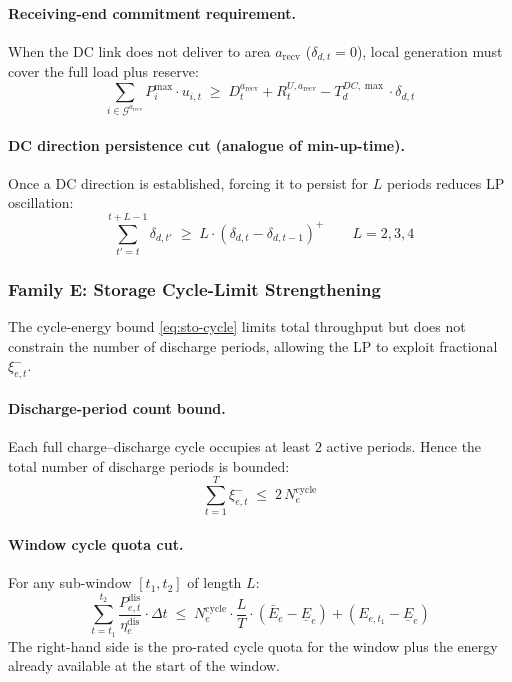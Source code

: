 \paragraph{Receiving-end commitment requirement.}
When the DC link does not deliver to area $a_{\mathrm{recv}}$
($\delta_{d,t} = 0$), local generation must cover the full load plus reserve:
\begin{equation}\label{eq:cut-D-recv}
  \boxed{
    \sum_{i \in \mathcal{G}^{a_{\mathrm{recv}}}} P^{\max}_i \cdot u_{i,t}
    \;\geq\;
    D^{a_{\mathrm{recv}}}_t + R^{U,a_{\mathrm{recv}}}_t
    - T^{DC,\max}_d \cdot \delta_{d,t}
  }
\end{equation}

\paragraph{DC direction persistence cut (analogue of min-up-time).}
Once a DC direction is established, forcing it to persist for $L$ periods
reduces LP oscillation:
\begin{equation}\label{eq:cut-D-persist}
  \sum_{t'=t}^{t+L-1} \delta_{d,t'} \;\geq\; L \cdot (\delta_{d,t} - \delta_{d,t-1})^+
  \qquad L = 2, 3, 4
\end{equation}

\subsubsection{Family E: Storage Cycle-Limit Strengthening}
\label{sec:cut-E}

The cycle-energy bound \eqref{eq:sto-cycle} limits total throughput but
does not constrain the number of discharge periods, allowing the LP to
exploit fractional $\xi^-_{e,t}$.

\paragraph{Discharge-period count bound.}
Each full charge--discharge cycle occupies at least $2$ active periods.
Hence the total number of discharge periods is bounded:
\begin{equation}\label{eq:cut-E-count}
  \boxed{
    \sum_{t=1}^{T} \xi^-_{e,t} \;\leq\; 2\,N^{\mathrm{cycle}}_e
  }
\end{equation}

\paragraph{Window cycle quota cut.}
For any sub-window $[t_1, t_2]$ of length $L$:
\begin{equation}\label{eq:cut-E-window}
  \boxed{
    \sum_{t=t_1}^{t_2} \frac{P^{\mathrm{dis}}_{e,t}}{\eta^{\mathrm{dis}}_e} \cdot \Delta t
    \;\leq\;
    N^{\mathrm{cycle}}_e \cdot \frac{L}{T} \cdot (\bar{E}_e - \underline{E}_e)
    + (E_{e,t_1} - \underline{E}_e)
  }
\end{equation}
The right-hand side is the pro-rated cycle quota for the window plus the
energy already available at the start of the window.

